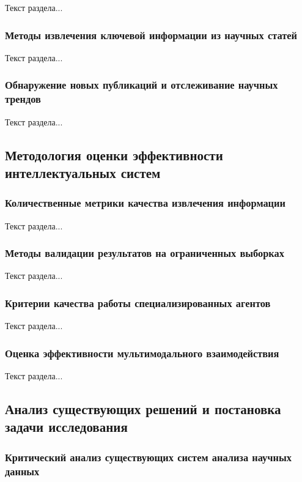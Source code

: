Текст раздела...

\subsubsection{Методы извлечения ключевой информации из научных статей}

Текст раздела...

\subsubsection{Обнаружение новых публикаций и отслеживание научных трендов}

Текст раздела...

\subsection{Методология оценки эффективности интеллектуальных систем}

\subsubsection{Количественные метрики качества извлечения информации}

Текст раздела...

\subsubsection{Методы валидации результатов на ограниченных выборках}

Текст раздела...

\subsubsection{Критерии качества работы специализированных агентов}

Текст раздела...

\subsubsection{Оценка эффективности мультимодального взаимодействия}

Текст раздела...

\subsection{Анализ существующих решений и постановка задачи исследования}

\subsubsection{Критический анализ существующих систем анализа научных данных}

